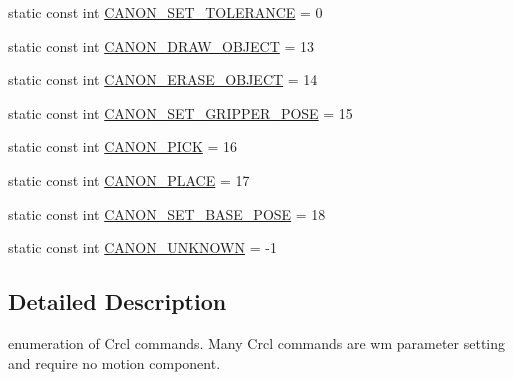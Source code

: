 \begin{DoxyCompactItemize}
static const int \hyperlink{structRCS_1_1CanonCmdType_affeb13b775ef50eff8967910600d2e16}{C\-A\-N\-O\-N\-\_\-\-S\-E\-T\-\_\-\-T\-O\-L\-E\-R\-A\-N\-C\-E} = 0
\item 
static const int \hyperlink{structRCS_1_1CanonCmdType_a9b829fde0c34dcf5e21acbaedc7af39f}{C\-A\-N\-O\-N\-\_\-\-D\-R\-A\-W\-\_\-\-O\-B\-J\-E\-C\-T} = 13
\item 
static const int \hyperlink{structRCS_1_1CanonCmdType_a948253b121b0c61286275024c20c568c}{C\-A\-N\-O\-N\-\_\-\-E\-R\-A\-S\-E\-\_\-\-O\-B\-J\-E\-C\-T} = 14
\item 
static const int \hyperlink{structRCS_1_1CanonCmdType_a44b59cc6690da0bb05fe4e9f3ca4c2ad}{C\-A\-N\-O\-N\-\_\-\-S\-E\-T\-\_\-\-G\-R\-I\-P\-P\-E\-R\-\_\-\-P\-O\-S\-E} = 15
\item 
static const int \hyperlink{structRCS_1_1CanonCmdType_a95e6cd920d67f6f1bbd12fdad483e5b7}{C\-A\-N\-O\-N\-\_\-\-P\-I\-C\-K} = 16
\item 
static const int \hyperlink{structRCS_1_1CanonCmdType_ac04b82b491a3ec593510e65a91e7de47}{C\-A\-N\-O\-N\-\_\-\-P\-L\-A\-C\-E} = 17
\item 
static const int \hyperlink{structRCS_1_1CanonCmdType_afbc12217424092982cc4657febdc8182}{C\-A\-N\-O\-N\-\_\-\-S\-E\-T\-\_\-\-B\-A\-S\-E\-\_\-\-P\-O\-S\-E} = 18
\item 
static const int \hyperlink{structRCS_1_1CanonCmdType_ae5844ed8c0de841a0357c032275f6e85}{C\-A\-N\-O\-N\-\_\-\-U\-N\-K\-N\-O\-W\-N} = -\/1
\end{DoxyCompactItemize}


\subsection{Detailed Description}
enumeration of Crcl commands. Many Crcl commands are wm parameter setting and require no motion component. 

